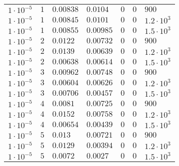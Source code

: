 \begin{table}[tbp]
\begin{tabular}{lllllll}
$1\cdot 10^{-5}$ & $1$ & $0.00838$ & $0.0104$ & $0$ & $0$ & $900$ \\
$1\cdot 10^{-5}$ & $1$ & $0.00845$ & $0.0101$ & $0$ & $0$ & $1.2\cdot 10^{3}$ \\
$1\cdot 10^{-5}$ & $1$ & $0.00855$ & $0.00985$ & $0$ & $0$ & $1.5\cdot 10^{3}$ \\
$1\cdot 10^{-5}$ & $2$ & $0.0122$ & $0.00732$ & $0$ & $0$ & $900$ \\
$1\cdot 10^{-5}$ & $2$ & $0.0139$ & $0.00639$ & $0$ & $0$ & $1.2\cdot 10^{3}$ \\
$1\cdot 10^{-5}$ & $2$ & $0.00638$ & $0.00614$ & $0$ & $0$ & $1.5\cdot 10^{3}$ \\
$1\cdot 10^{-5}$ & $3$ & $0.00962$ & $0.00748$ & $0$ & $0$ & $900$ \\
$1\cdot 10^{-5}$ & $3$ & $0.00604$ & $0.00626$ & $0$ & $0$ & $1.2\cdot 10^{3}$ \\
$1\cdot 10^{-5}$ & $3$ & $0.00706$ & $0.00457$ & $0$ & $0$ & $1.5\cdot 10^{3}$ \\
$1\cdot 10^{-5}$ & $4$ & $0.0081$ & $0.00725$ & $0$ & $0$ & $900$ \\
$1\cdot 10^{-5}$ & $4$ & $0.0152$ & $0.00758$ & $0$ & $0$ & $1.2\cdot 10^{3}$ \\
$1\cdot 10^{-5}$ & $4$ & $0.00654$ & $0.00439$ & $0$ & $0$ & $1.5\cdot 10^{3}$ \\
$1\cdot 10^{-5}$ & $5$ & $0.013$ & $0.00721$ & $0$ & $0$ & $900$ \\
$1\cdot 10^{-5}$ & $5$ & $0.0129$ & $0.00394$ & $0$ & $0$ & $1.2\cdot 10^{3}$ \\
$1\cdot 10^{-5}$ & $5$ & $0.0072$ & $0.0027$ & $0$ & $0$ & $1.5\cdot 10^{3}$ \\
\hline
\end{tabular}
\end{table}
